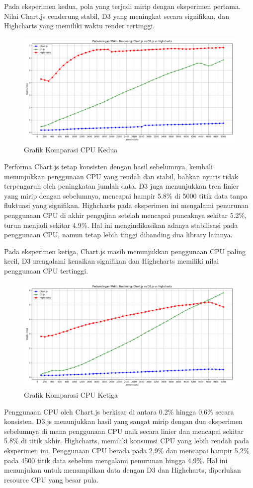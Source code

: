 Pada eksperimen kedua, pola yang terjadi mirip dengan eksperimen pertama. Nilai Chart.js cenderung stabil, D3 yang meningkat secara signifikan, dan Highcharts yang memiliki waktu render tertinggi. 
	\begin{figure}[H]
	\centering
	\includegraphics[width=0.8\linewidth]{gambar/Pembahasan/FIX_CPU/Figure_2.png}
	\caption{Grafik Komparasi CPU Kedua}
	\label{Grafik Komparasi CPU Kedua}
\end{figure}
Performa Chart.js tetap konsisten dengan hasil sebelumnya, kembali menunjukkan penggunaan CPU yang rendah dan stabil, bahkan nyaris tidak terpengaruh oleh peningkatan jumlah data. D3 juga menunjukkan tren linier yang mirip dengan sebelumnya, mencapai hampir 5.8\% di 5000 titik data tanpa fluktuasi yang signifikan. Highcharts pada eksperimen ini mengalami penurunan penggunaan CPU di akhir pengujian setelah mencapai puncaknya sekitar 5.2\%, turun menjadi sekitar 4.9\%. Hal ini mengindikasikan adanya stabilisasi pada penggunaan CPU, namun tetap lebih tinggi dibanding dua library lainnya.

Pada eksperimen ketiga, Chart.js masih menunjukkan penggunaan CPU paling kecil, D3 mengalami kenaikan signifikan dan Highcharts memiliki nilai penggunaan CPU tertinggi. 
	\begin{figure}[H]
	\centering
	\includegraphics[width=0.8\linewidth]{gambar/Pembahasan/FIX_CPU/Figure_3.png}
	\caption{Grafik Komparasi CPU Ketiga}
	\label{Grafik Komparasi CPU Ketiga}
\end{figure}
Penggunaan CPU oleh Chart.js berkisar di antara 0.2\% hingga 0.6\% secara konsisten. D3.js menunjukkan hasil yang sangat mirip dengan dua eksperimen sebelumnya di mana penggunaan CPU naik secara linier dan mencapai sekitar 5.8\% di titik akhir. Highcharts, memiliki konsumsi CPU yang lebih rendah pada eksperimen ini. Penggunaan CPU berada pada 2,9\% dan mencapai hampir 5,2\% pada 4500 titik data sebelum mengalami penurunan hingga 4,9\%. Hal ini menunjukan untuk menampilkan data dengan  D3 dan Highcharts, diperlukan resource CPU yang besar pula.

